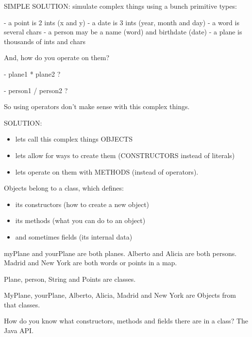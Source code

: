 \documentclass[a4paper, 9pt]{extarticle}
\begin{document}
SIMPLE SOLUTION: simulate complex things using a bunch primitive types:

\begin{blackboard}
- a point is 2 ints (x and y)
- a date is 3 ints (year, month and day)
- a word is several chars
- a person may be a name (word) and birthdate (date)
- a plane is thousands of ints and chars
\end{blackboard}

And, how do you operate on them?

\begin{blackboard}
  - plane1 * plane2 ?

  - person1 / person2 ?
\end{blackboard}

So using operators don't make sense with this complex things.

SOLUTION:
\begin{itemize}
\item lets call this complex things OBJECTS
\item lets allow for ways to create them (CONSTRUCTORS instead of literals)
\item lets operate on them with METHODS (instead of operators).
\end{itemize}

Objects belong to a class, which defines:

\begin{itemize}

  \item its constructors (how to create a new object)

  \item its methods (what you can do to an object)

  \item and sometimes fields (its internal data)

\end{itemize}

\begin{blackboard}
myPlane and yourPlane are both planes.
Alberto and Alicia are both persons.
Madrid and New York are both words or points in a map.

Plane, person, String and Points are classes.

MyPlane, yourPlane, Alberto, Alicia, Madrid and New York are Objects from
that classes.
\end{blackboard}

How do you know what constructors, methods and fields there are in a class? The
Java API.
\end{document}
